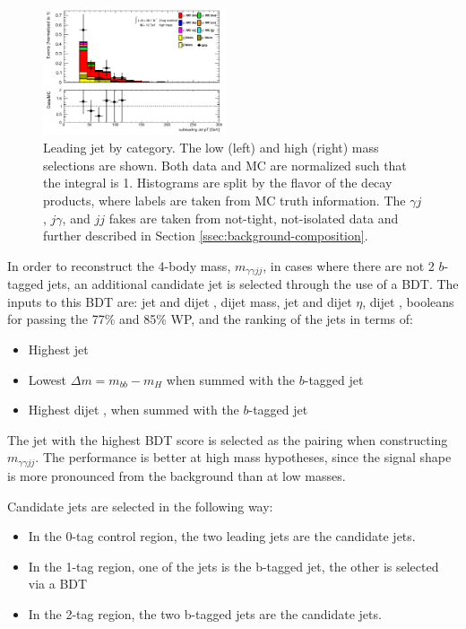\begin{figure}[p]
  \includegraphics[width=0.48\textwidth]{chapters/chapter5_yybb/images/data_MC_comparison/h_SR_h_2t_nominal_subleadingJet_pt.pdf}
  \caption[Subleading jet \pt by \btagging category]{Leading jet \pt by \btagging category. The low (left) and high (right) mass selections are shown. Both data and MC are normalized such that the integral is 1. Histograms are split by the flavor of the \Hbb decay products, where labels are taken from \gls{MC} truth information. The $\gamma j$, $j\gamma$, and $jj$ fakes are taken from not-tight, not-isolated data and further described in Section \ref{ssec:background-composition}.
  \label{fig:jet_s_pt}}
\end{figure}

In order to reconstruct the 4-body mass, $m_{\gamma\gamma jj}$, in cases where there are not 2 $b$-tagged jets, an additional candidate jet is selected through the use of a \gls{BDT}. The inputs to this \gls{BDT} are: jet and dijet \pt, dijet mass, jet and dijet $\eta$, dijet \Deta, booleans for passing the 77\% and 85\% \btagging WP, and the ranking of the jets in terms of:

\begin{itemize}
  \item Highest jet \pt
  \item Lowest $\Delta m = m_{bb} - m_H$ when summed with the $b$-tagged jet
  \item Highest dijet \pt, when summed with the $b$-tagged jet
\end{itemize}

The jet with the highest \gls{BDT} score is selected as the pairing when constructing  $m_{\gamma\gamma jj}$. The performance is better at high mass hypotheses, since the signal shape is more pronounced from the background than at low masses. 

Candidate jets are selected in the following way:
\begin{itemize}
  \item In the 0-tag control region, the two leading jets are the candidate jets.
  \item In the 1-tag region, one of the jets is the b-tagged jet, the other is selected via a \gls{BDT}
  \item In the 2-tag region, the two b-tagged jets are the candidate jets.
\end{itemize}


